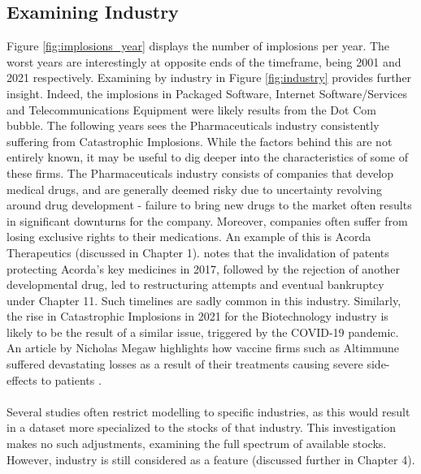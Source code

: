 \documentclass[a4paper]{report}
\begin{document}
\subsection{Examining Industry}
Figure \ref{fig:implosions_year} displays the number of implosions per year. The worst years are interestingly at opposite ends of the timeframe, being 2001 and 2021 respectively. Examining 
by industry in Figure \ref{fig:industry} provides further insight. Indeed, the implosions in Packaged Software, Internet Software/Services and Telecommunications Equipment were likely 
results from the Dot Com bubble. The following years sees the Pharmaceuticals industry consistently suffering from Catastrophic Implosions. While the factors behind this are not entirely known, 
it may be useful to dig deeper into the characteristics of some of these firms. The Pharmaceuticals industry consists of companies that develop medical drugs, and are generally deemed risky 
due to uncertainty revolving around drug development - failure to bring new drugs to the market often results in significant downturns for the company. Moreover, companies often suffer from losing exclusive rights 
to their medications. An example of this is Acorda Therapeutics (discussed in Chapter 1). \cite{acorda2} notes that the invalidation of patents protecting Acorda’s key medicines in 2017, followed by the rejection of another developmental drug, 
led to restructuring attempts and eventual bankruptcy under Chapter 11. Such timelines are sadly common in this industry. Similarly, the rise in Catastrophic Implosions
in 2021 for the Biotechnology industry is likely to be the result of a similar issue, triggered by the COVID-19 pandemic. An article by Nicholas Megaw 
highlights how vaccine firms such as Altimmune suffered devastating losses as a result of their treatments causing severe side-effects 
to patients \citep{financialtimes}.\\\\Several studies often restrict modelling to specific industries, as this would result in a dataset more specialized to the stocks 
of that industry. This investigation makes no such adjustments, examining the full spectrum of available stocks. However, industry is still considered as a feature (discussed further in Chapter 4).
\end{document}
